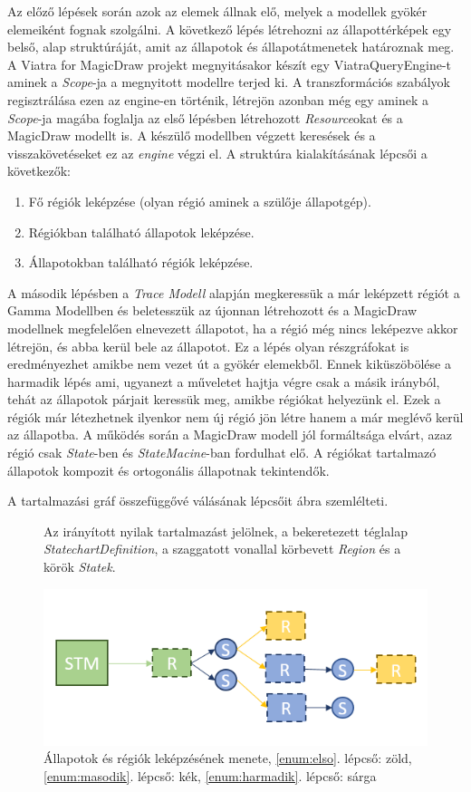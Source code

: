 Az előző lépések során azok az elemek állnak elő, melyek a modellek gyökér elemeiként fognak szolgálni. A következő lépés létrehozni az állapottérképek egy belső, alap struktúráját, amit az állapotok és állapotátmenetek határoznak meg. A Viatra for MagicDraw projekt megnyitásakor készít egy ViatraQueryEngine-t aminek a \emph{Scope}-ja a megnyitott modellre terjed ki. A transzformációs szabályok regisztrálása ezen az engine-en történik, létrejön azonban még egy aminek a \emph{Scope}-ja magába foglalja az első lépésben létrehozott \emph{Resource}okat és a MagicDraw modellt is. A készülő modellben végzett keresések és a visszakövetéseket ez az \emph{engine} végzi el. A struktúra kialakításának lépcsői a következők:
\begin{enumerate}
	\item Fő régiók leképzése (olyan régió aminek a szülője állapotgép).
	\label{enum:elso}
	\item Régiókban található állapotok leképzése.
	\label{enum:masodik}
	\item Állapotokban található régiók leképzése.
	\label{enum:harmadik}
\end{enumerate}
A második lépésben a \emph{Trace Modell} alapján megkeressük a már leképzett régiót a Gamma Modellben és beletesszük az újonnan létrehozott és a MagicDraw modellnek megfelelően elnevezett állapotot, ha a régió még nincs leképezve akkor létrejön, és abba kerül bele az állapotot. Ez a lépés olyan részgráfokat is eredményezhet amikbe nem vezet út a gyökér elemekből. Ennek kiküszöbölése a harmadik lépés ami, ugyanezt a műveletet hajtja végre csak a másik irányból, tehát az állapotok párjait keressük meg, amikbe régiókat helyezünk el. Ezek a régiók már létezhetnek ilyenkor nem új régió jön létre hanem a már meglévő kerül az állapotba. A működés során a MagicDraw modell jól formáltsága elvárt, azaz régió csak \emph{State}-ben és \emph{StateMacine}-ban fordulhat elő. A régiókat tartalmazó állapotok kompozit és ortogonális állapotnak tekintendők.

A tartalmazási gráf összefüggővé válásának lépcsőit  ábra szemlélteti.

\begin{figure}[H]
Az irányított nyilak tartalmazást jelölnek, a bekeretezett téglalap \emph{StatechartDefinition}, a szaggatott vonallal körbevett \emph{Region} és a körök \emph{Statek}.

\centering
\includegraphics[keepaspectratio, width=140mm]{figures/transformation.png}
\caption{Állapotok és régiók leképzésének menete, \ref{enum:elso}. lépcső: zöld, \ref{enum:masodik}. lépcső: kék, \ref{enum:harmadik}. lépcső: sárga}
\label{fig:state-transformation}
\end{figure}

